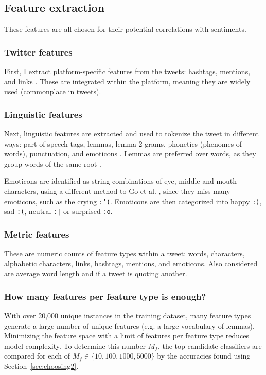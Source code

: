 \documentclass[11pt]{article}
\begin{document}
\subsection{Feature extraction}

These features are all chosen for their potential correlations with sentiments.

\subsubsection{{T}witter features}

First, I extract platform-specific features from the tweets: 
hashtags, mentions, and links \cite{go09,robustnoisy10}.
These are integrated within the platform, meaning they are widely used (commonplace in tweets).

\subsubsection{Linguistic features}

Next, linguistic features are extracted and used to tokenize the tweet in different ways: 
part-of-speech tags, lemmas, lemma 2-grams, phonetics (phenomes of words), punctuation, and emoticons \cite{robustnoisy10,nltk,cmudict}.
Lemmas are preferred over words, as they group words of the same root \cite{nltk}.


Emoticons are identified as string combinations of eye, middle and mouth characters, 
using a different method to Go et al. ,
since they miss many emoticons, such as the crying \texttt{:'(}.
Emoticons are then categorized into happy \texttt{:)}, sad \texttt{:(}, neutral \texttt{:|} or surprised \texttt{:o}.

\subsubsection{Metric features}

These are numeric counts of feature types within a tweet: words, characters, alphabetic characters, links, hashtags, mentions, and emoticons.
Also considered are average word length and if a tweet is quoting another.

\subsubsection{How many features per feature type is enough?}

With over 20,000 unique instances in the training dataset, many feature types generate a large number of unique features (e.g. a large vocabulary of lemmas).
Minimizing the feature space with a limit of features per feature type reduces model complexity.
To determine this number $M_f$, the top candidate classifiers are compared for each of $M_f \in \lbrace 10, 100, 1000, 5000 \rbrace$ by the accuracies found using Section~\ref{sec:choosing2}.
\end{document}
